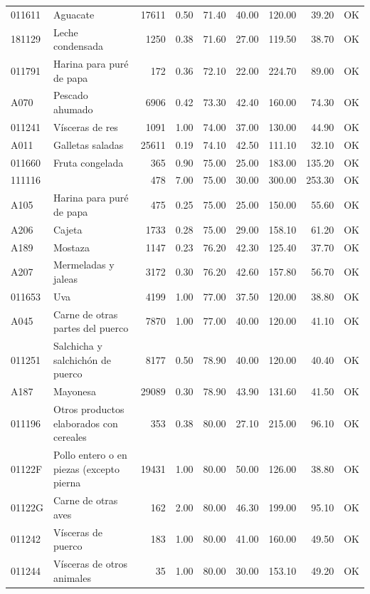 \begin{table}[ht]
\begin{tabular}{llrrrrrrl}
  011611 & Aguacate & 17611 & 0.50 & 71.40 & 40.00 & 120.00 & 39.20 & OK \\ 
  181129 & Leche condensada & 1250 & 0.38 & 71.60 & 27.00 & 119.50 & 38.70 & OK \\ 
  011791 & Harina para puré de papa & 172 & 0.36 & 72.10 & 22.00 & 224.70 & 89.00 & OK \\ 
  A070 & Pescado ahumado & 6906 & 0.42 & 73.30 & 42.40 & 160.00 & 74.30 & OK \\ 
  011241 & Vísceras de res & 1091 & 1.00 & 74.00 & 37.00 & 130.00 & 44.90 & OK \\ 
  A011 & Galletas saladas & 25611 & 0.19 & 74.10 & 42.50 & 111.10 & 32.10 & OK \\ 
  011660 & Fruta congelada & 365 & 0.90 & 75.00 & 25.00 & 183.00 & 135.20 & OK \\ 
  111116 &  & 478 & 7.00 & 75.00 & 30.00 & 300.00 & 253.30 & OK \\ 
  A105 & Harina para puré de papa & 475 & 0.25 & 75.00 & 25.00 & 150.00 & 55.60 & OK \\ 
  A206 & Cajeta & 1733 & 0.28 & 75.00 & 29.00 & 158.10 & 61.20 & OK \\ 
  A189 & Mostaza & 1147 & 0.23 & 76.20 & 42.30 & 125.40 & 37.70 & OK \\ 
  A207 & Mermeladas y jaleas & 3172 & 0.30 & 76.20 & 42.60 & 157.80 & 56.70 & OK \\ 
  011653 & Uva & 4199 & 1.00 & 77.00 & 37.50 & 120.00 & 38.80 & OK \\ 
  A045 & Carne de otras partes del puerco & 7870 & 1.00 & 77.00 & 40.00 & 120.00 & 41.10 & OK \\ 
  011251 & Salchicha y salchichón de puerco & 8177 & 0.50 & 78.90 & 40.00 & 120.00 & 40.40 & OK \\ 
  A187 & Mayonesa & 29089 & 0.30 & 78.90 & 43.90 & 131.60 & 41.50 & OK \\ 
  011196 & Otros productos elaborados con cereales & 353 & 0.38 & 80.00 & 27.10 & 215.00 & 96.10 & OK \\ 
  01122F & Pollo entero o en piezas (excepto pierna & 19431 & 1.00 & 80.00 & 50.00 & 126.00 & 38.80 & OK \\ 
  01122G & Carne de otras aves & 162 & 2.00 & 80.00 & 46.30 & 199.00 & 95.10 & OK \\ 
  011242 & Vísceras de puerco & 183 & 1.00 & 80.00 & 41.00 & 160.00 & 49.50 & OK \\ 
  011244 & Vísceras de otros animales &  35 & 1.00 & 80.00 & 30.00 & 153.10 & 49.20 & OK \\ 

\end{tabular}
\end{table}
